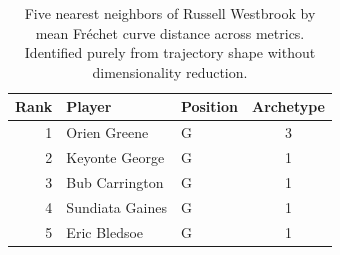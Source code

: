 \begin{table}[htbp]
  \centering\small
  \begin{tabular}{rllc}
    \toprule
    Rank & Player & Position & Archetype \\
    \midrule
    1 & Orien Greene & G & 3 \\
    2 & Keyonte George & G & 1 \\
    3 & Bub Carrington & G & 1 \\
    4 & Sundiata Gaines & G & 1 \\
    5 & Eric Bledsoe & G & 1 \\
    \bottomrule
  \end{tabular}
  \caption{Five nearest neighbors of Russell Westbrook by mean Fr\'{e}chet curve distance across metrics. Identified purely from trajectory shape without dimensionality reduction.}
  \label{tab:Russell_Westbrook_frechet_curve_neighbors}
\end{table}

